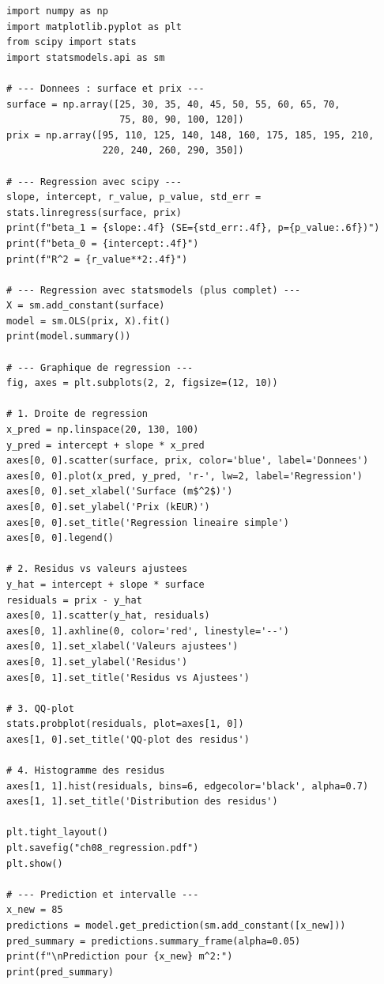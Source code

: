 \begin{python}
\begin{verbatim}
import numpy as np
import matplotlib.pyplot as plt
from scipy import stats
import statsmodels.api as sm

# --- Donnees : surface et prix ---
surface = np.array([25, 30, 35, 40, 45, 50, 55, 60, 65, 70,
                    75, 80, 90, 100, 120])
prix = np.array([95, 110, 125, 140, 148, 160, 175, 185, 195, 210,
                 220, 240, 260, 290, 350])

# --- Regression avec scipy ---
slope, intercept, r_value, p_value, std_err = stats.linregress(surface, prix)
print(f"beta_1 = {slope:.4f} (SE={std_err:.4f}, p={p_value:.6f})")
print(f"beta_0 = {intercept:.4f}")
print(f"R^2 = {r_value**2:.4f}")

# --- Regression avec statsmodels (plus complet) ---
X = sm.add_constant(surface)
model = sm.OLS(prix, X).fit()
print(model.summary())

# --- Graphique de regression ---
fig, axes = plt.subplots(2, 2, figsize=(12, 10))

# 1. Droite de regression
x_pred = np.linspace(20, 130, 100)
y_pred = intercept + slope * x_pred
axes[0, 0].scatter(surface, prix, color='blue', label='Donnees')
axes[0, 0].plot(x_pred, y_pred, 'r-', lw=2, label='Regression')
axes[0, 0].set_xlabel('Surface (m$^2$)')
axes[0, 0].set_ylabel('Prix (kEUR)')
axes[0, 0].set_title('Regression lineaire simple')
axes[0, 0].legend()

# 2. Residus vs valeurs ajustees
y_hat = intercept + slope * surface
residuals = prix - y_hat
axes[0, 1].scatter(y_hat, residuals)
axes[0, 1].axhline(0, color='red', linestyle='--')
axes[0, 1].set_xlabel('Valeurs ajustees')
axes[0, 1].set_ylabel('Residus')
axes[0, 1].set_title('Residus vs Ajustees')

# 3. QQ-plot
stats.probplot(residuals, plot=axes[1, 0])
axes[1, 0].set_title('QQ-plot des residus')

# 4. Histogramme des residus
axes[1, 1].hist(residuals, bins=6, edgecolor='black', alpha=0.7)
axes[1, 1].set_title('Distribution des residus')

plt.tight_layout()
plt.savefig("ch08_regression.pdf")
plt.show()

# --- Prediction et intervalle ---
x_new = 85
predictions = model.get_prediction(sm.add_constant([x_new]))
pred_summary = predictions.summary_frame(alpha=0.05)
print(f"\nPrediction pour {x_new} m^2:")
print(pred_summary)
\end{verbatim}
\end{python}

